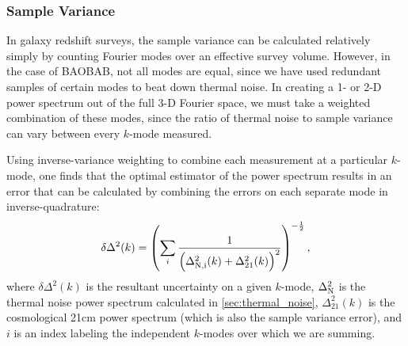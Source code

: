 \documentclass[10pt,iop]{emulateapj}
\begin{document}
\subsubsection{Sample Variance}
\label{sec:sample_variance}

In galaxy redshift surveys, the sample variance can be calculated relatively simply by 
counting Fourier modes over an effective survey volume.  However, in the case of BAOBAB,
not all modes are equal, since we have used redundant samples of certain modes to beat down thermal
noise.  In creating a 1- or 2-D power spectrum out of the full 3-D Fourier space,
we must take a weighted combination of these modes, since the ratio of 
thermal noise to sample variance can vary between every $k$-mode measured.

Using inverse-variance weighting to combine each measurement at a particular $k$-mode, 
one finds that the optimal estimator of the power spectrum results in an error
that can be calculated by combining the errors on each separate mode in inverse-quadrature:
\begin{equation}
\delta \Delta^2(k) = \left(\sum\limits_i\frac{1}{\left(\Delta^2_{\rm{N},i}(k)+\Delta^2_{21}(k)\right)^2}\right)^{-\frac12},
\end{equation}
where $\delta\Delta^2(k)$ is the resultant uncertainty on a given $k$-mode, $\Delta^2_{\rm N}$ 
is the thermal noise power spectrum calculated in \ref{sec:thermal_noise}, $\Delta^2_{21}(k)$
is the cosmological 21cm power spectrum (which is also the sample variance error), and $i$
is an index labeling the independent $k$-modes over which we are summing.
\end{document}

